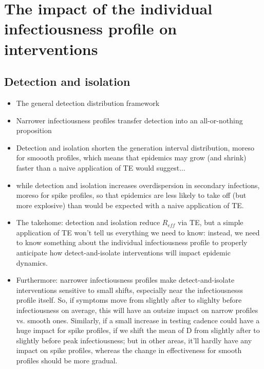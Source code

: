 \clearpage

\section{The impact of the individual infectiousness profile on interventions}

\subsection{Detection and isolation}


\begin{itemize}
	\item The general detection distribution framework
	\item Narrower infectiousness profiles transfer detection into an all-or-nothing proposition 
	\item Detection and isolation shorten the generation interval distribution, moreso for smoooth profiles, which means that epidemics may grow (and shrink) faster than a naive application of TE would suggest...
	\item while detection and isolation increases overdispersion in secondary infections, moreso for spike profiles, so that epidemics are less likely to take off (but more explosive) than would be expected with a naive application of TE. 
	\item The takehome: detection and isolation reduce $R_{eff}$ via TE, but a simple application of TE won't tell us everything we need to know: instead, we need to know something about the individual infectiousness profile to properly anticipate how detect-and-isolate interventions will impact epidemic dynamics. 
	\item Furthermore: narrower infectiousness profiles make detect-and-isolate interventions sensitive to small shifts, especially near the infectiousnesss profile itself. So, if symptoms move from slightly after to slighlty before infectiousness on average, this will have an outsize impact on narrow profiles vs. smooth ones. Similarly, if a small increase in testing cadence could have a huge impact for spike profiles, if we shift the mean of D from slightly after to slightly before peak infectiousness; but in other areas, it'll hardly have any impact on spike profiles, whereas the change in effectiveness for smooth profiles should be more gradual. 

\end{itemize}
